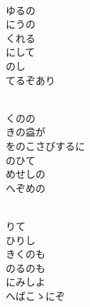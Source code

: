 \documentclass[10pt,b5j]{tarticle} %
\begin{document}
\vspace{1.5em} %
\newcommand{\linespace}{0.5em} %
\newcommand{\blocksize}{0.5\hsize} %
\newcommand{\itemmargin}{3em} %
\begin{enumerate} %
    \setlength{\itemindent}{\itemmargin} %
    \begin{minipage}[c]{\blocksize}
    
        \vspace{\linespace}
        \item~\\
        ゆるの\\
        にうの\\
        くれる\\
        にして\\
        のし\\
        てるぞあり
        
    \end{minipage}
    \begin{minipage}[c]{\blocksize}
        
        \vspace{\linespace}
        \item~\\
        くのの\\
        きの益が\\
        をのこさびするに\\
        のひて\\
        めせしの\\
        へぞめの
        
    \end{minipage}
    \begin{minipage}[c]{\blocksize}
        
        \vspace{\linespace}
        \item~\\
        りて\\
        ひりし\\
        きくのも\\
        のるのも\\
        にみしよ\\
        へばこゝにぞ
        

\end{minipage}
\end{enumerate}
\end{document}
